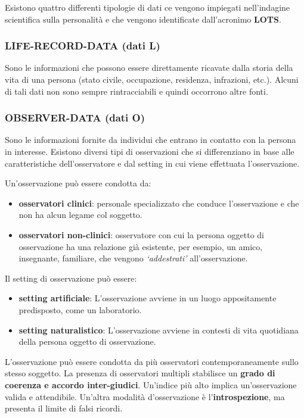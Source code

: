 \documentclass{subfiles}
\begin{document}
Esistono quattro differenti tipologie di dati ce vengono impiegati nell'indagine scientifica sulla 
personalità e che vengono identificate dall'acronimo \textbf{LOTS}.

\subsubsection{LIFE-RECORD-DATA (dati L)}
Sono le informazioni che possono essere direttamente ricavate dalla storia della vita di una 
persona (stato civile, occupazione, residenza, infrazioni, etc.).
Alcuni di tali dati non sono sempre rintracciabili e quindi occorrono altre fonti.

\subsubsection{OBSERVER-DATA (dati O)}
Sono le informazioni fornite da individui che entrano in contatto con la persona in interesse.
Esistono diversi tipi di osservazioni che si differenziano in base alle caratteristiche 
dell'osservatore e dal setting in cui viene effettuata l'osservazione.

Un'osservazione può essere condotta da: 
\begin{itemize}
    \item \textbf{osservatori clinici}: personale specializzato che conduce l'osservazione e che
     non ha alcun legame col soggetto. 
    \item \textbf{osservatori non-clinici}: osservatore con cui la persona oggetto di 
    osservazione ha una relazione già esistente, per esempio, un amico, insegnante, familiare, 
    che vengono \textit{`addestrati'} all'osservazione. 
\end{itemize}

Il setting di osservazione può essere:
\begin{itemize}
    \item \textbf{setting artificiale}: L'osservazione avviene in un luogo appositamente 
    predisposto, come un laboratorio. 
    \item  \textbf{setting naturalistico}: L'osservazione avviene in contesti di vita quotidiana 
    della persona oggetto di osservazione.
\end{itemize}

L'osservazione può essere condotta da più osservatori contemporaneamente sullo stesso soggetto.
La presenza di osservatori multipli stabilisce un \textbf{grado di coerenza e accordo inter-giudici}.
Un'indice più alto implica un'osservazione valida e attendibile.
Un'altra modalità d'osservazione è l'\textbf{introspezione}, ma presenta il limite di falsi ricordi. 
\end{document}
